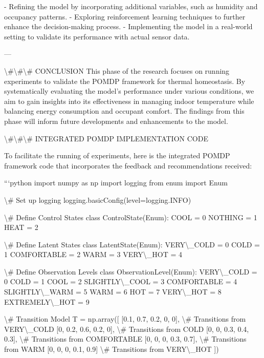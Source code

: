 \documentclass[11pt,a4paper]{article}
\begin{document}
- Refining the model by incorporating additional variables, such as humidity and occupancy patterns.
- Exploring reinforcement learning techniques to further enhance the decision-making process.
- Implementing the model in a real-world setting to validate its performance with actual sensor data.

---

\textbackslash{}#\textbackslash{}#\textbackslash{}# CONCLUSION
This phase of the research focuses on running experiments to validate the POMDP framework for thermal homeostasis. By systematically evaluating the model's performance under various conditions, we aim to gain insights into its effectiveness in managing indoor temperature while balancing energy consumption and occupant comfort. The findings from this phase will inform future developments and enhancements to the model.

\textbackslash{}#\textbackslash{}#\textbackslash{}# INTEGRATED POMDP IMPLEMENTATION CODE

To facilitate the running of experiments, here is the integrated POMDP framework code that incorporates the feedback and recommendations received:

```python
import numpy as np
import logging
from enum import Enum

\textbackslash{}# Set up logging
logging.basicConfig(level=logging.INFO)

\textbackslash{}# Define Control States
class ControlState(Enum):
    COOL = 0
    NOTHING = 1
    HEAT = 2

\textbackslash{}# Define Latent States
class LatentState(Enum):
    VERY\textbackslash{}_COLD = 0
    COLD = 1
    COMFORTABLE = 2
    WARM = 3
    VERY\textbackslash{}_HOT = 4

\textbackslash{}# Define Observation Levels
class ObservationLevel(Enum):
    VERY\textbackslash{}_COLD = 0
    COLD = 1
    COOL = 2
    SLIGHTLY\textbackslash{}_COOL = 3
    COMFORTABLE = 4
    SLIGHTLY\textbackslash{}_WARM = 5
    WARM = 6
    HOT = 7
    VERY\textbackslash{}_HOT = 8
    EXTREMELY\textbackslash{}_HOT = 9

\textbackslash{}# Transition Model
T = np.array([
    [0.1, 0.7, 0.2, 0, 0],  \textbackslash{}# Transitions from VERY\textbackslash{}_COLD
    [0, 0.2, 0.6, 0.2, 0],  \textbackslash{}# Transitions from COLD
    [0, 0, 0.3, 0.4, 0.3],  \textbackslash{}# Transitions from COMFORTABLE
    [0, 0, 0, 0.3, 0.7],    \textbackslash{}# Transitions from WARM
    [0, 0, 0, 0.1, 0.9]     \textbackslash{}# Transitions from VERY\textbackslash{}_HOT
])
\end{document}
